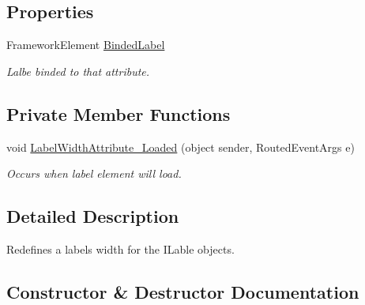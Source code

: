 \subsection*{Properties}
\begin{DoxyCompactItemize}
\item 
Framework\+Element \mbox{\hyperlink{class_wpf_handler_1_1_u_i_1_1_auto_layout_1_1_options_1_1_label_width_attribute_ae3a052219f7ebdf78dc6e47962a9f8b9}{Binded\+Label}}
\begin{DoxyCompactList}\small\item\em Lalbe binded to that attribute. \end{DoxyCompactList}\end{DoxyCompactItemize}
\subsection*{Private Member Functions}
\begin{DoxyCompactItemize}
\item 
void \mbox{\hyperlink{class_wpf_handler_1_1_u_i_1_1_auto_layout_1_1_options_1_1_label_width_attribute_a16e03ce7309091450367210b02392b1b}{Label\+Width\+Attribute\+\_\+\+Loaded}} (object sender, Routed\+Event\+Args e)
\begin{DoxyCompactList}\small\item\em Occurs when label element will load. \end{DoxyCompactList}\end{DoxyCompactItemize}


\subsection{Detailed Description}
Redefines a label\textquotesingle{}s width for the I\+Lable objects. 



\subsection{Constructor \& Destructor Documentation}
\mbox{\label{class_wpf_handler_1_1_u_i_1_1_auto_layout_1_1_options_1_1_label_width_attribute_a466768b6dfd74a49bcae860cb52ab7ab}} 
